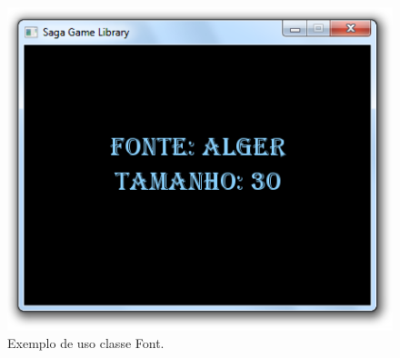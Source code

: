 \begin{figure}[H]
    \centering
		\caption{Exemplo de uso classe Font.}
    \label{ExemploFont}
    \includegraphics[scale = 0.70]{Imagens/ExemploFont.png}
\end{figure}
%
%
%
